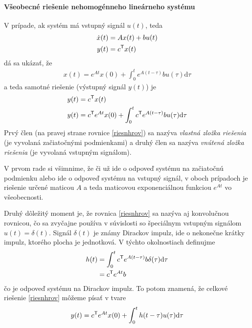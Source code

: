 \documentclass[a4paper, 10pt, ]{article}
\begin{document}
\paragraph{Všeobecné riešenie nehomogénneho lineárneho systému}

V prípade, ak systém má vstupný signál $u(t)$, teda
\begin{subequations}
\begin{align}
	\dot x(t) &= A x(t) + b u(t) \\
	y(t) &= c^{\mathsf{T}} x(t)
\end{align}
\end{subequations}
dá sa ukázať, že
\begin{align} \label{xriesLTI}
	x(t) = e^{At} x(0) + \int_0^t e^{A(t-\tau)} b u(\tau) \text{d}\tau
\end{align}
a teda samotné riešenie (výstupný signál $y(t)$) je
\begin{align}
	y(t) &= c^{\mathsf{T}} x(t) \\
	y(t) &= c^{\mathsf{T}} e^{At} x(0) + \int_0^t c^{\mathsf{T}} e^{A(t-\tau)} b u(\tau) \text{d}\tau \label{riesnhrov}
\end{align}
Prvý člen (na pravej strane rovnice \eqref{riesnhrov}) sa nazýva \emph{vlastná zložka riešenia} (je vyvolaná začiatočnými podmienkami) a druhý člen sa nazýva  \emph{vnútená zložka riešenia} (je vyvolaná vstupným signálom).

\bigskip

V prvom rade si všimnime, že či už ide o odpoveď systému na začiatočnú podmienku alebo ide o odpoveď systému na vstupný signál, v oboch prípadoch je riešenie určené maticou $A$ a teda maticovou exponenciálnou funkciou $e^{At}$ vo všeobecnosti.

Druhý dôležitý moment je, že rovnica \eqref{riesnhrov} sa nazýva aj konvolučnou rovnicou, čo sa zvyčajne používa v súvislosti so špeciálnym vstupným signálom $u(t) = \delta(t)$. Signál $\delta(t)$ je známy Dirackov impulz, ide o nekonečne krátky impulz, ktorého plocha je jednotková. V týchto okolnostiach definujme
\begin{equation}
	\begin{aligned}
		h(t) &= \int_0^t c^{\mathsf{T}} e^{A(t-\tau)} b \delta(\tau) \text{d}\tau \\
		&= c^{\mathsf{T}} e^{At} b
	\end{aligned}
\end{equation}
čo je odpoveď systému na Dirackov impulz. To potom znamená, že celkové riešenie \eqref{riesnhrov} môžeme písať v tvare
\begin{align}
	y(t) = c^{\mathsf{T}} e^{At} x(0) + \int_0^t h(t - \tau) u(\tau) \text{d}\tau
\end{align}
\end{document}
